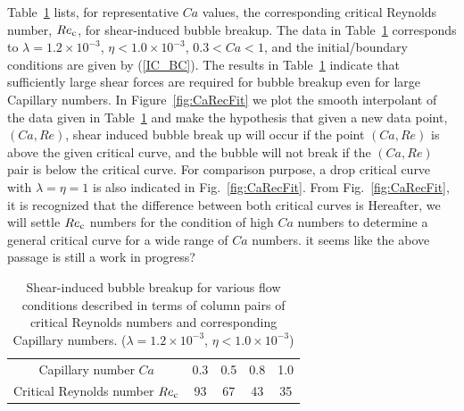 \documentclass[%
 reprint,
 showkeys,
 amsmath,amssymb,
 aps,
 prfluids,
 onecolumn
]{revtex4-2}
\begin{document}
Table~\ref{tab:CaRecComparison} 
lists, for representative $Ca$ values,
the corresponding critical Reynolds number, $Re_{\rm c}$, for shear-induced 
bubble breakup.  The data in 
Table~\ref{tab:CaRecComparison} 
corresponds to $\lambda = 1.2 \times 10^{-3}$, $\eta < 1.0 \times 10^{-3}$, $0.3<Ca<1$, and
the initial/boundary conditions are given by (\ref{IC_BC}).
The results in Table~\ref{tab:CaRecComparison}
indicate that sufficiently large shear forces are required for bubble breakup even for large Capillary numbers. 
In Figure~\ref{fig:CaRecFit} we plot the smooth interpolant of the data given in Table~\ref{tab:CaRecComparison} and 
make the hypothesis that given a new data point, $(Ca,Re)$,  shear induced bubble break up will occur if the point $(Ca,Re)$ 
is above the given critical curve, and the bubble will not break if the $(Ca,Re)$ pair is below the critical curve.
{\color {red} For comparison purpose, a drop critical curve with $\lambda =\eta = 1$ is also indicated in Fig.~\ref{fig:CaRecFit}.
From Fig.~\ref{fig:CaRecFit}, it is recognized that the difference between both critical curves is 
Hereafter, we will settle $Re_{\rm c}$ numbers for the condition of 
high $Ca$ numbers to determine a general critical curve 
for a wide range of $Ca$ numbers.}
{\color{blue} it seems like the above passage is still a work in progress?}

%
\begin{table}[tbh]
\caption{Shear-induced bubble breakup for various flow 
	conditions described in terms
        of column pairs of critical Reynolds numbers and 
	corresponding Capillary numbers.
        ($\lambda = 1.2 \times 10^{-3}$, $\eta < 1.0 \times 10^{-3}$) 
	}
\label{tab:CaRecComparison}
\footnotesize
\center
\begin{tabular}{ c  c  c  c  c }
\hline
\hline
Capillary number $Ca$            & 0.3  & 0.5  & 0.8  & 1.0  \\
Critical Reynolds number $Re_{\rm c}$  & 93   & 67   & 43   & 35   \\
\hline
\hline
\end{tabular}
\end{table}
\end{document}
